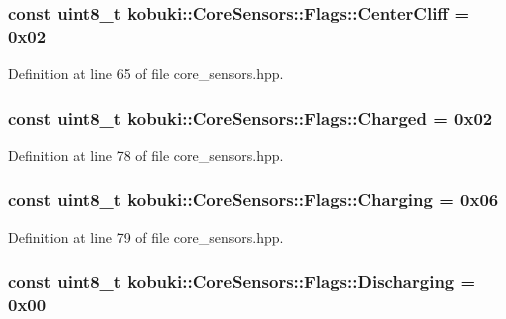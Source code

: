 \subsubsection[{\-Center\-Cliff}]{\setlength{\rightskip}{0pt plus 5cm}const uint8\-\_\-t {\bf kobuki\-::\-Core\-Sensors\-::\-Flags\-::\-Center\-Cliff} = 0x02\hspace{0.3cm}{\ttfamily  [static]}}\label{structkobuki_1_1CoreSensors_1_1Flags_a1b5e6cb42d25bec2e9030341f4b8df4b}


\-Definition at line 65 of file core\-\_\-sensors.\-hpp.

\subsubsection[{\-Charged}]{\setlength{\rightskip}{0pt plus 5cm}const uint8\-\_\-t {\bf kobuki\-::\-Core\-Sensors\-::\-Flags\-::\-Charged} = 0x02\hspace{0.3cm}{\ttfamily  [static]}}\label{structkobuki_1_1CoreSensors_1_1Flags_a37a146ce9d17489e29223cf8eda52731}


\-Definition at line 78 of file core\-\_\-sensors.\-hpp.

\subsubsection[{\-Charging}]{\setlength{\rightskip}{0pt plus 5cm}const uint8\-\_\-t {\bf kobuki\-::\-Core\-Sensors\-::\-Flags\-::\-Charging} = 0x06\hspace{0.3cm}{\ttfamily  [static]}}\label{structkobuki_1_1CoreSensors_1_1Flags_a944248c28c8097de503af120b1afe3e6}


\-Definition at line 79 of file core\-\_\-sensors.\-hpp.

\subsubsection[{\-Discharging}]{\setlength{\rightskip}{0pt plus 5cm}const uint8\-\_\-t {\bf kobuki\-::\-Core\-Sensors\-::\-Flags\-::\-Discharging} = 0x00\hspace{0.3cm}{\ttfamily  [static]}}\label{structkobuki_1_1CoreSensors_1_1Flags_a7478f59ea180abc589c314a9be8c6d52}


